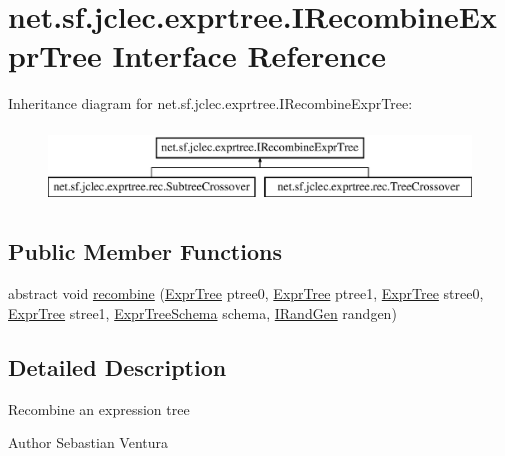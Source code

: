 \hypertarget{interfacenet_1_1sf_1_1jclec_1_1exprtree_1_1_i_recombine_expr_tree}{\section{net.\-sf.\-jclec.\-exprtree.\-I\-Recombine\-Expr\-Tree Interface Reference}
\label{interfacenet_1_1sf_1_1jclec_1_1exprtree_1_1_i_recombine_expr_tree}
}
Inheritance diagram for net.\-sf.\-jclec.\-exprtree.\-I\-Recombine\-Expr\-Tree\-:\begin{figure}[H]
\begin{center}
\leavevmode
\includegraphics[height=2.000000cm]{interfacenet_1_1sf_1_1jclec_1_1exprtree_1_1_i_recombine_expr_tree}
\end{center}
\end{figure}
\subsection*{Public Member Functions}
\begin{DoxyCompactItemize}
\item 
abstract void \hyperlink{interfacenet_1_1sf_1_1jclec_1_1exprtree_1_1_i_recombine_expr_tree_a4ae061fc0993d4bfcb3a821adffa8b2c}{recombine} (\hyperlink{classnet_1_1sf_1_1jclec_1_1exprtree_1_1_expr_tree}{Expr\-Tree} ptree0, \hyperlink{classnet_1_1sf_1_1jclec_1_1exprtree_1_1_expr_tree}{Expr\-Tree} ptree1, \hyperlink{classnet_1_1sf_1_1jclec_1_1exprtree_1_1_expr_tree}{Expr\-Tree} stree0, \hyperlink{classnet_1_1sf_1_1jclec_1_1exprtree_1_1_expr_tree}{Expr\-Tree} stree1, \hyperlink{classnet_1_1sf_1_1jclec_1_1exprtree_1_1_expr_tree_schema}{Expr\-Tree\-Schema} schema, \hyperlink{interfacenet_1_1sf_1_1jclec_1_1util_1_1random_1_1_i_rand_gen}{I\-Rand\-Gen} randgen)
\end{DoxyCompactItemize}


\subsection{Detailed Description}
Recombine an expression tree

\begin{DoxyAuthor}{Author}
Sebastian Ventura 
\end{DoxyAuthor}



